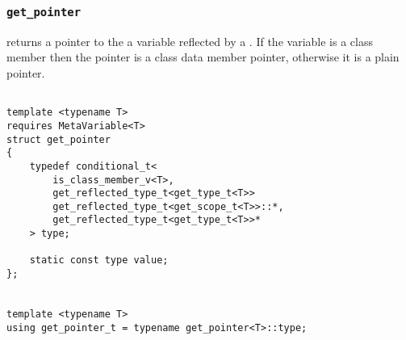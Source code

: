 
\subsubsection{\texttt{get\_pointer}}

returns a pointer to the a variable reflected by a .   If the variable is a class member then the pointer is a class data member pointer,   otherwise it is a plain pointer.

\begin{verbatim}

template <typename T>
requires MetaVariable<T>
struct get_pointer
{
	typedef conditional_t<
		is_class_member_v<T>,
		get_reflected_type_t<get_type_t<T>>
		get_reflected_type_t<get_scope_t<T>>::*,
		get_reflected_type_t<get_type_t<T>>*
	> type;

	static const type value;
};


template <typename T>
using get_pointer_t = typename get_pointer<T>::type;

\end{verbatim}
